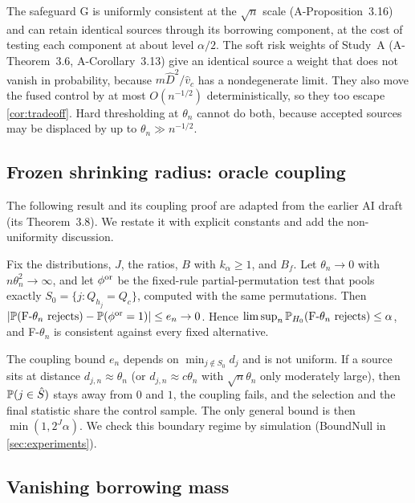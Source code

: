 \documentclass[11pt,a4paper]{article}
\begin{document}
\begin{remark}
The safeguard G is uniformly consistent at the $\sqrt n$ scale (A-Proposition~3.16) and can retain identical sources through its borrowing component, at the cost of testing each component at about level $\alpha/2$. The soft risk weights of Study~A (A-Theorem~3.6, A-Corollary~3.13) give an identical source a weight that does not vanish in probability, because $m\hat D^2/\hat v_c$ has a nondegenerate limit. They also move the fused control by at most $O(n^{-1/2})$ deterministically, so they too escape \cref{cor:tradeoff}. Hard thresholding at $\theta_n$ cannot do both, because accepted sources may be displaced by up to $\theta_n\gg n^{-1/2}$.
\end{remark}

\subsection{Frozen shrinking radius: oracle coupling}\label{sec:frozen}

The following result and its coupling proof are adapted from the earlier AI draft (its Theorem~3.8). We restate it with explicit constants and add the non-uniformity discussion.

\begin{theorem}\label{thm:frozen}
Fix the distributions, $J$, the ratios, $B$ with $k_\alpha\ge1$, and $B_f$. Let $\theta_n\to0$ with $n\theta_n^2\to\infty$, and let $\phi^{\rm or}$ be the fixed-rule partial-permutation test that pools exactly $S_0=\{j:Q_{h_j}=Q_c\}$, computed with the same permutations. Then $|\P(\text{F-}\theta_n\text{ rejects})-\P(\phi^{\rm or}=1)|\le e_n\to0$. Hence $\limsup_n\P_{H_0}(\text{F-}\theta_n\text{ rejects})\le\alpha$, and F-$\theta_n$ is consistent against every fixed alternative.
\end{theorem}

The coupling bound $e_n$ depends on $\min_{j\notin S_0}d_j$ and is not uniform. If a source sits at distance $d_{j,n}\approx\theta_n$ (or $d_{j,n}\approx c\theta_n$ with $\sqrt n\theta_n$ only moderately large), then $\P(j\in\hat S)$ stays away from $0$ and $1$, the coupling fails, and the selection and the final statistic share the control sample. The only general bound is then $\min(1,2^J\alpha)$. We check this boundary regime by simulation (BoundNull in \cref{sec:experiments}).

\subsection{Vanishing borrowing mass}\label{sec:mass}
\end{document}
